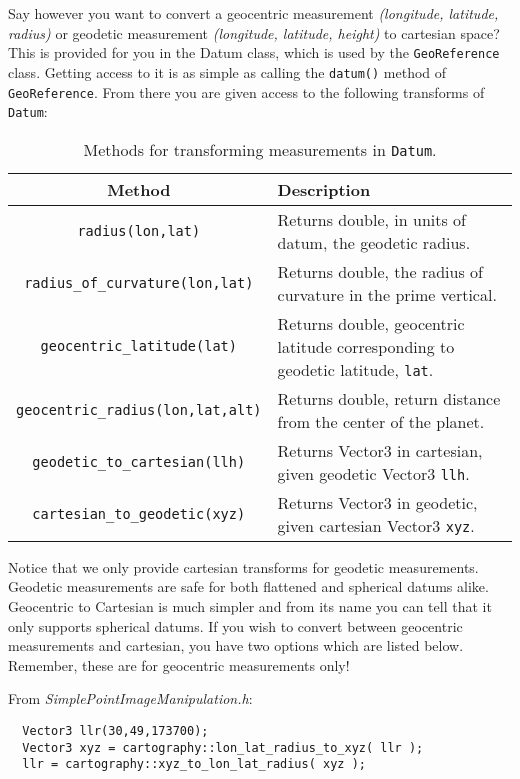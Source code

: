 Say however you want to convert a geocentric measurement
\emph{(longitude, latitude, radius)} or geodetic measurement
\emph{(longitude, latitude, height)} to cartesian space? This is
provided for you in the Datum class, which is used by the
\verb#GeoReference# class. Getting access to it is as simple as
calling the \verb#datum()# method of \verb#GeoReference#. From there
you are given access to the following transforms of \verb#Datum#:

\begin{table}[htb]\begin{centering}
\begin{tabular}{|c|p{5 in}|} \hline
Method & Description \\ \hline \hline
\verb#radius(lon,lat)# & Returns double, in units of datum, the geodetic radius.\\ \hline
\verb#radius_of_curvature(lon,lat)# & Returns double, the radius of curvature in the prime vertical.\\ \hline
\verb#geocentric_latitude(lat)# & Returns double, geocentric latitude corresponding to geodetic latitude, \verb#lat#.\\ \hline
\verb#geocentric_radius(lon,lat,alt)# & Returns double, return distance from the center of the planet.\\ \hline
\verb#geodetic_to_cartesian(llh)# & Returns Vector3 in cartesian, given geodetic Vector3 \verb#llh#.\\ \hline
\verb#cartesian_to_geodetic(xyz)# & Returns Vector3 in geodetic, given cartesian Vector3 \verb#xyz#.\\ \hline
\end{tabular}
\caption{Methods for transforming measurements in {\tt Datum}.}
\end{centering}
\end{table}

Notice that we only provide cartesian transforms for geodetic
measurements. Geodetic measurements are safe for both flattened and
spherical datums alike. Geocentric to Cartesian is much simpler and
from its name you can tell that it only supports spherical datums. If
you wish to convert between geocentric measurements and cartesian, you
have two options which are listed below. Remember, these are for
geocentric measurements only!

From {\it SimplePointImageManipulation.h}:
\begin{verbatim}
  Vector3 llr(30,49,173700);
  Vector3 xyz = cartography::lon_lat_radius_to_xyz( llr );
  llr = cartography::xyz_to_lon_lat_radius( xyz );
\end{verbatim}

